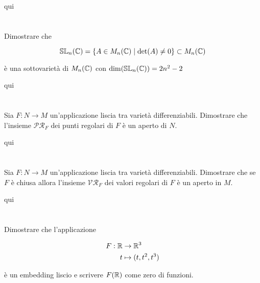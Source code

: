 qui

\tocless\section{}\label{es2-16}

\begin{tcolorbox}
	Dimostrare che
	
	\begin{equation}
		\mathbb{SL}_{n}(\mathbb{C}) = \{ A \in M_{n}(\mathbb{C}) \mid \det(A) \neq 0 \} \subset M_{n}(\mathbb{C})
	\end{equation}

	è una sottovarietà di $ M_{n}(\mathbb{C}) $ con $ \dim(\mathbb{SL}_{n}(\mathbb{C})) = 2n^{2}-2  $
\end{tcolorbox}

qui

\tocless\section{}\label{es2-17}

\begin{tcolorbox}
	Sia $ F : N \to M $ un'applicazione liscia tra varietà differenziabili. Dimostrare che l'insieme $ \mathcal{PR}_{F} $ dei punti regolari di $ F $ è un aperto di $ N $.
\end{tcolorbox}

qui

\tocless\section{}\label{es2-18}

\begin{tcolorbox}
		Sia $ F : N \to M $ un'applicazione liscia tra varietà differenziabili. Dimostrare che se $ F $ è chiusa allora  l'insieme $ \mathcal{VR}_{F} $ dei valori regolari di $ F $ è un aperto in $ M $.
\end{tcolorbox}

qui

\tocless\section{}\label{es2-19}

\begin{tcolorbox}
	Dimostrare che l'applicazione
	
	\begin{align}
		\begin{split}
			F : \mathbb{R} &\to \mathbb{R}^{3}\\
			t &\mapsto (t,t^{2},t^{3})
		\end{split}
	\end{align}

	è un embedding liscio e scrivere $ F(\mathbb{R}) $ come zero di funzioni.
\end{tcolorbox}


